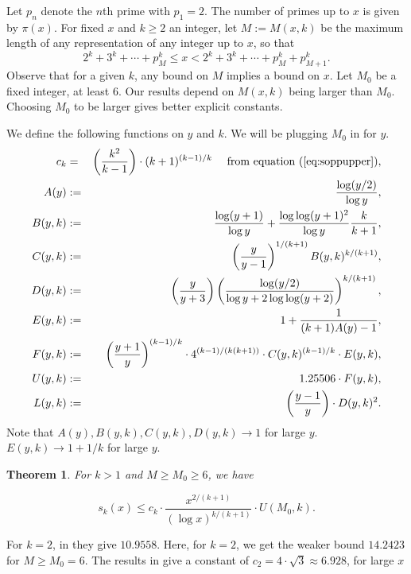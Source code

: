 \documentclass[11pt]{amsart}
\newtheorem{thm}{Theorem}[section]
\numberwithin{equation}{section}
\numberwithin{algorithm}{section}
\begin{document}
Let $p_n$ denote the $n$th prime with $p_1=2$.
The number of primes up to $x$ is given by $\pi(x)$.
For fixed $x$ and $k\ge2$ an integer,
let $M:=M(x,k)$ be the maximum length of any representation of any
  integer up to $x$, so that
\begin{equation} \label{eq:x}
2^k + 3^k + \cdots + p_M^k \le x
  < 2^k + 3^k + \cdots + p_M^k+p_{M+1}^k.
\end{equation}
Observe that for a given $k$, 
any bound on $M$ implies a bound on $x$.
Let $M_0$ be a fixed integer, at least $6$.
Our results depend on $M(x,k)$ being larger than $M_0$.
Choosing $M_0$ to be larger gives better explicit constants.

We define the following functions on $y$ and $k$.
We will be plugging $M_0$ in for $y$.
\begin{eqnarray*}
c_k& =& \left(\frac{k^2}{k-1}\right) \cdot (k+1)^{(k-1)/k} \quad
  \mbox{  from equation (\ref{eq:soppupper})},\\
    A(y)&:=& \frac{\log (y/2)}{\log y} , \\
    B(y,k)&:=& \frac{\log (y+1)}{\log y}+
  \frac{\log\log(y+1)^2}{\log y} \frac{k}{k+1}, \\
     C(y,k)&:=&
    \left(\frac{y}{y-1}\right)^{1/(k+1)} B(y,k)^{k/(k+1)}, \\
    D(y,k)&:=&
    \left(\frac{y}{y+3}\right)
 \left(\frac{\log(y/2)}{\log y + 2\log\log(y+2)}\right)^{k/(k+1)},\\
 E(y,k)&:=&1+\frac{1}{(k+1)A(y)-1},\\
F(y,k)&:=&\left(\frac{y+1}{y} \right)^{(k-1)/k} \cdot 4^{(k-1)/(k(k+1))}
  \cdot C(y,k)^{(k-1)/k}\cdot E(y,k), \\
  U(y,k) &:=& 1.25506 \cdot F(y,k), \\
  L(y,k) &:=& \left(\frac{y-1}{y} \right)\cdot D(y,k)^2.
\end{eqnarray*}
Note that $A(y),B(y,k),C(y,k),D(y,k)\rightarrow 1$ for large $y$.
$E(y,k)\rightarrow 1+1/k$ for large $y$.


\begin{thm}\label{thm:skxupper} For $k>1$ and $M\ge M_0\ge 6$, we have 

$$
s_k(x) \le  c_k \cdot
\frac{x^{2/(k+1)}}{(\log x)^{k/(k+1)}}
\cdot U(M_0,k).
$$
\end{thm}
For $k=2$, in \cite{TWS2022} they give $10.9558$.
Here, for $k=2$, we get the weaker bound $14.2423$ for $M\ge M_0=6$.
The results in \cite{OSS2024} give a constant
of $c_2=4\cdot\sqrt{3}\approx 6.928$, for large $x$
\end{document}
